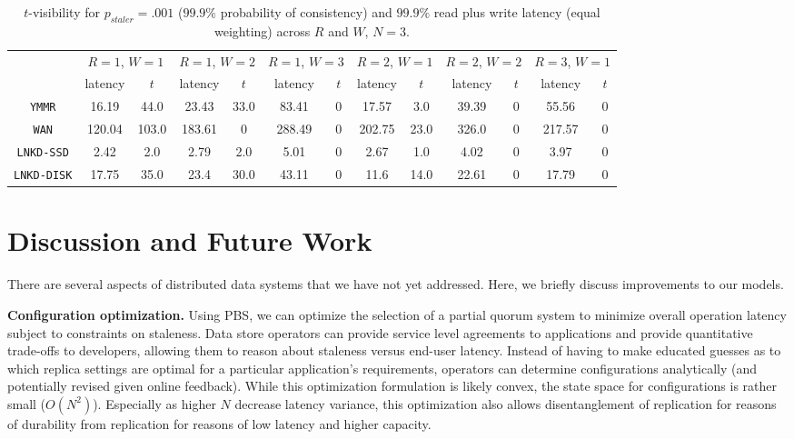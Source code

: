 \documentclass{vldb}
\begin{document}
\begin{table}
\centering
\begin{tabular}{c|c|c|c|c|c|c|c|c|c|c|c|c|}
\cline{2-13}
& \multicolumn{2}{|c|}{$R$$=$$1$, $W$$=$$1$} & \multicolumn{2}{|c|}{$R$$=$$1$, $W$$=$$2$} & \multicolumn{2}{|c|}{$R$$=$$1$, $W$$=$$3$} & \multicolumn{2}{|c|}{$R$$=$$2$, $W$$=$$1$} & \multicolumn{2}{|c|}{$R$$=$$2$, $W$$=$$2$} & \multicolumn{2}{|c|}{$R$$=$$3$, $W$$=$$1$}  \\
&\multicolumn{1}{|c}{latency} & \multicolumn{1}{c|}{$t$} &  \multicolumn{1}{|c}{latency} & \multicolumn{1}{c|}{$t$} &  \multicolumn{1}{|c}{latency} & \multicolumn{1}{c|}{$t$} &  \multicolumn{1}{|c}{latency} & \multicolumn{1}{c|}{$t$} &  \multicolumn{1}{|c}{latency} & \multicolumn{1}{c|}{$t$} &  \multicolumn{1}{|c}{latency} & \multicolumn{1}{c|}{$t$}   \\ \hline
\multicolumn{1}{|c|}{\texttt{YMMR}} & 
16.19 & 44.0 & 23.43 & 33.0 & 83.41 & 0 & 17.57 & 3.0 & 39.39 & 0 & 55.56 & 0  \\
\multicolumn{1}{|c|}{\texttt{WAN}} & 
120.04 & 103.0 & 183.61 & 0 & 288.49 & 0 & 202.75 & 23.0 & 326.0 & 0 & 217.57 & 0 \\
\multicolumn{1}{|c|}{\texttt{LNKD-SSD}} & 
2.42 & 2.0 & 2.79 & 2.0 & 5.01 & 0 & 2.67 & 1.0 & 4.02 & 0 & 3.97 & 0  \\
\multicolumn{1}{|c|}{\texttt{LNKD-DISK}} & 
17.75 & 35.0 & 23.4 & 30.0 & 43.11 & 0 & 11.6 & 14.0 & 22.61 & 0 & 17.79 & 0  \\
\hline
\end{tabular}
\caption{$t$-visibility for $p_{staler} = .001$ ($99.9\%$ probability of consistency) and $99.9\%$ read plus write latency (equal weighting) across $R$ and $W$, $N$$=$$3$.}
\label{table:lat-stale}
\end{table}


\section{Discussion and Future Work}
\label{sec:discussion}

There are several aspects of distributed data systems that we have not yet
addressed.  Here, we briefly discuss improvements to our models.

\textbf{Configuration optimization.} Using PBS, we can optimize the
selection of a partial quorum system to minimize overall operation
latency subject to constraints on staleness.  Data store operators can
provide service level agreements to applications and provide
quantitative trade-offs to developers, allowing them to reason about
staleness versus end-user latency.  Instead of having to make educated
guesses as to which replica settings are optimal for a particular
application's requirements, operators can determine configurations
analytically (and potentially revised given online feedback).  While
this optimization formulation is likely convex, the state space for
configurations is rather small ($O(N^2)$).  Especially as higher $N$
decrease latency variance, this optimization also allows
disentanglement of replication for reasons of durability from
replication for reasons of low latency and higher capacity.
\end{document}
